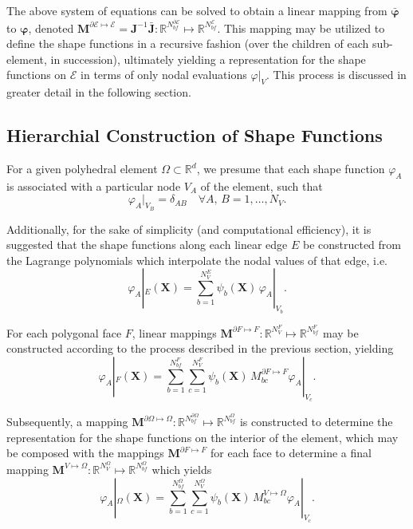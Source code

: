 	The above system of equations can be solved to obtain a linear mapping from $\bar{\boldsymbol{\varphi}}$ to $\boldsymbol{\varphi}$, denoted $\mathbf{M}^{\partial \mathcal{E} \mapsto \mathcal{E}} = \mathbf{J}^{-1} \bar{\mathbf{J}} : \mathbb{R}^{N^{\partial \mathcal{E}}_{bf}} \mapsto \mathbb{R}^{N^{\mathcal{E}}_{bf}}$. This mapping may be utilized to define the shape functions in a recursive fashion (over the children of each sub-element, in succession), ultimately yielding a representation for the shape functions on $\mathcal{E}$ in terms of only nodal evaluations $\varphi|_{V}$. This process is discussed in greater detail in the following section.
	
\subsection*{Hierarchial Construction of Shape Functions}

	For a given polyhedral element $\Omega \subset \mathbb{R}^d$, we presume that each shape function $\varphi_A$ is associated with a particular node $V_A$ of the element, such that
	\begin{equation}
		\varphi_A |_{V_B} = \delta_{AB} \quad \forall A, \, B = 1, \ldots, N_V.
	\end{equation}
	
	Additionally, for the sake of simplicity (and computational efficiency), it is suggested that the shape functions along each linear edge $E$ be constructed from the Lagrange polynomials which interpolate the nodal values of that edge, i.e.
	\begin{equation}
		\varphi_A |_{E} (\mathbf{X}) = \sum_{b = 1}^{N^E_V} \psi_b (\mathbf{X}) \, \varphi_A |_{V_b}.
	\end{equation}

	For each polygonal face $F$, linear mappings $\mathbf{M}^{\partial F \mapsto F} : \mathbb{R}^{N^{F}_{V}} \mapsto \mathbb{R}^{N^{F}_{bf}}$ may be constructed according to the process described in the previous section, yielding 
	\begin{equation}
		\varphi_A |_{F} (\mathbf{X}) = \sum_{b = 1}^{N^F_{bf}} \sum_{c = 1}^{N^F_{V}} \psi_b (\mathbf{X}) \, M^{\partial F \mapsto F}_{bc} \varphi_A |_{V_c}.
	\end{equation}

	Subsequently, a mapping $\mathbf{M}^{\partial \Omega \mapsto \Omega} : \mathbb{R}^{N^{\partial \Omega}_{bf}} \mapsto \mathbb{R}^{N^{\Omega}_{bf}}$ is constructed to determine the representation for the shape functions on the interior of the element, which may be composed with the mappings $\mathbf{M}^{\partial F \mapsto F}$ for each face to determine a final mapping $\mathbf{M}^{V \mapsto \Omega} : \mathbb{R}^{N^{\Omega}_{V}} \mapsto \mathbb{R}^{N^{\Omega}_{bf}}$ which yields
	\begin{equation}
		\varphi_A |_{\Omega} (\mathbf{X}) = \sum_{b = 1}^{N^\Omega_{bf}} \sum_{c = 1}^{N^\Omega_{V}} \psi_b (\mathbf{X}) \, M^{V \mapsto \Omega}_{bc} \varphi_A |_{V_c}.
	\end{equation}

